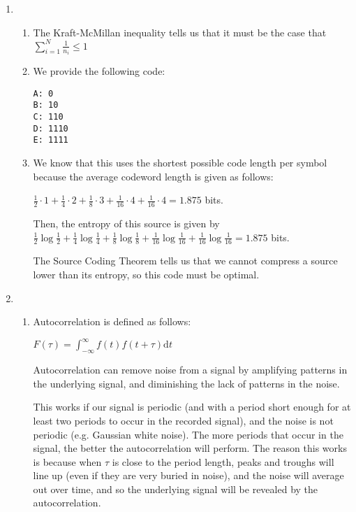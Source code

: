


\begin{enumerate}[label=(\alph*)]
  \item
    \begin{enumerate}[label=(\roman*)]
      \item
        The Kraft-McMillan inequality tells us that it must be the case that $\sum_{i=1}^N \frac{1}{n_i} \leq 1$

      \item
        We provide the following code:

\begin{verbatim}
A: 0
B: 10
C: 110
D: 1110
E: 1111
\end{verbatim}

\item
  We know that this uses the shortest possible code length per symbol because the average codeword length is given as follows:

  $\frac{1}{2} \cdot 1 + \frac{1}{4} \cdot 2 + \frac{1}{8} \cdot 3 + \frac{1}{16} \cdot 4 + \frac{1}{16} \cdot 4 =  1.875$ bits.

  Then, the entropy of this source is given by $\frac{1}{2} \log \frac{1}{2} + \frac{1}{4} \log \frac{1}{4} + \frac{1}{8}\log\frac{1}{8} + \frac{1}{16} \log \frac{1}{16} + \frac{1}{16} \log \frac{1}{16} = 1.875$ bits.

  The Source Coding Theorem tells us that we cannot compress a source lower than its entropy, so this code must be optimal.
    \end{enumerate}

  \item
    \begin{enumerate}[label=(\roman*)]

      \item
        Autocorrelation is defined as follows:

        $F(\tau) = \int_{-\infty}^\infty f(t)f(t + \tau) \mathrm{d}t$


        Autocorrelation can remove noise from a signal by amplifying patterns in the underlying signal, and diminishing the lack of patterns in the noise.

        This works if our signal is periodic (and with a period short enough for at least two periods to occur in the recorded signal), and the noise is not periodic (e.g. Gaussian white noise). The more periods that occur in the signal, the better the autocorrelation will perform. The reason this works is because when $\tau$ is close to the period length, peaks and troughs will line up (even if they are very buried in noise), and the noise will average out over time, and so the underlying signal will be revealed by the autocorrelation.


\end{enumerate}
\end{enumerate}
